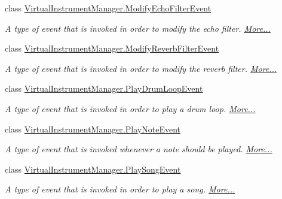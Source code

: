 \begin{DoxyCompactItemize}
class \hyperlink{group___event_types_class_virtual_instrument_manager_1_1_modify_echo_filter_event}{Virtual\+Instrument\+Manager.\+Modify\+Echo\+Filter\+Event}
\begin{DoxyCompactList}\small\item\em A type of event that is invoked in order to modify the echo filter.  \hyperlink{group___event_types_class_virtual_instrument_manager_1_1_modify_echo_filter_event}{More...}\end{DoxyCompactList}\item 
class \hyperlink{group___event_types_class_virtual_instrument_manager_1_1_modify_reverb_filter_event}{Virtual\+Instrument\+Manager.\+Modify\+Reverb\+Filter\+Event}
\begin{DoxyCompactList}\small\item\em A type of event that is invoked in order to modify the reverb filter.  \hyperlink{group___event_types_class_virtual_instrument_manager_1_1_modify_reverb_filter_event}{More...}\end{DoxyCompactList}\item 
class \hyperlink{group___event_types_class_virtual_instrument_manager_1_1_play_drum_loop_event}{Virtual\+Instrument\+Manager.\+Play\+Drum\+Loop\+Event}
\begin{DoxyCompactList}\small\item\em A type of event that is invoked in order to play a drum loop.  \hyperlink{group___event_types_class_virtual_instrument_manager_1_1_play_drum_loop_event}{More...}\end{DoxyCompactList}\item 
class \hyperlink{group___event_types_class_virtual_instrument_manager_1_1_play_note_event}{Virtual\+Instrument\+Manager.\+Play\+Note\+Event}
\begin{DoxyCompactList}\small\item\em A type of event that is invoked whenever a note should be played.  \hyperlink{group___event_types_class_virtual_instrument_manager_1_1_play_note_event}{More...}\end{DoxyCompactList}\item 
class \hyperlink{group___event_types_class_virtual_instrument_manager_1_1_play_song_event}{Virtual\+Instrument\+Manager.\+Play\+Song\+Event}
\begin{DoxyCompactList}\small\item\em A type of event that is invoked in order to play a song.  \hyperlink{group___event_types_class_virtual_instrument_manager_1_1_play_song_event}{More...}\end{DoxyCompactList}\item 

\end{DoxyCompactItemize}
